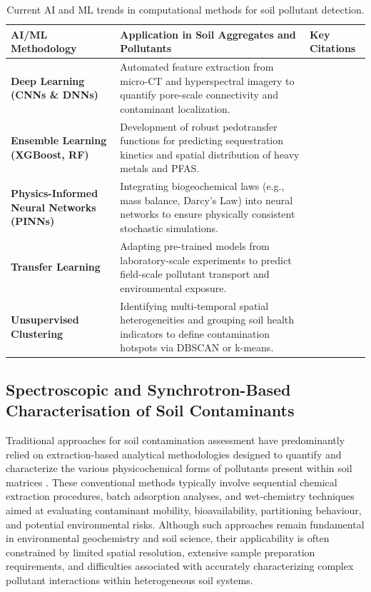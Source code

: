 \documentclass[sn-mathphys-num]{sn-jnl}
\begin{document}
\begin{table}[ht]
\centering
\caption{Current AI and ML trends in computational methods for soil
    pollutant detection.}
\label{tab:AI_ML_Soil_Trends}
\small
\begin{tabularx}{\textwidth}{|p{3.5cm}|p{7cm}|X|}
\hline
\textbf{AI/ML Methodology}
    & \textbf{Application in Soil Aggregates and Pollutants}
    & \textbf{Key Citations} \\ \hline
\textbf{Deep Learning (CNNs \& DNNs)}
    & Automated feature extraction from micro-CT and hyperspectral imagery
      to quantify pore-scale connectivity and contaminant localization.
    & \cite{Demiral2026,Fan2025} \\ \hline
\textbf{Ensemble Learning (XGBoost, RF)}
    & Development of robust pedotransfer functions for predicting sequestration
      kinetics and spatial distribution of heavy metals and PFAS.
    & \cite{Sahab2025,Wadoux2024} \\ \hline
\textbf{Physics-Informed Neural Networks (PINNs)}
    & Integrating biogeochemical laws (e.g., mass balance, Darcy's Law) into
      neural networks to ensure physically consistent stochastic simulations.
    & \cite{Karpatne2024} \\ \hline
\textbf{Transfer Learning}
    & Adapting pre-trained models from laboratory-scale experiments to predict
      field-scale pollutant transport and environmental exposure.
    & \cite{Nguyen2025} \\ \hline
\textbf{Unsupervised Clustering}
    & Identifying multi-temporal spatial heterogeneities and grouping soil
      health indicators to define contamination hotspots via DBSCAN or
      k-means.
    & \cite{Haller2023,deOliveiraetal2022} \\ \hline
\end{tabularx}
\end{table}

\subsection{Spectroscopic and Synchrotron-Based Characterisation of Soil
    Contaminants}\label{sec3.1}

Traditional approaches for soil contamination assessment have predominantly
relied on extraction-based analytical methodologies designed to quantify and
characterize the various physicochemical forms of pollutants present within
soil matrices \cite{Sutherland2010}. These conventional methods typically
involve sequential chemical extraction procedures, batch adsorption analyses,
and wet-chemistry techniques aimed at evaluating contaminant mobility,
bioavailability, partitioning behaviour, and potential environmental risks.
Although such approaches remain fundamental in environmental geochemistry and
soil science, their applicability is often constrained by limited spatial
resolution, extensive sample preparation requirements, and difficulties
associated with accurately characterizing complex pollutant interactions within
heterogeneous soil systems.
\end{document}
